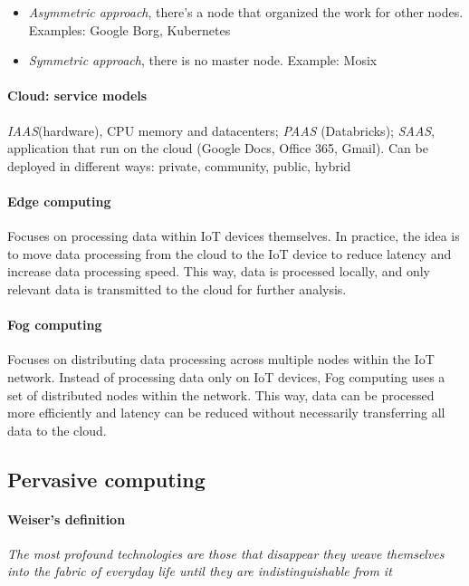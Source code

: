  \begin{itemize}
     \item \textit{Asymmetric approach}, there’s a node that organized the work for other nodes. Examples: Google Borg, Kubernetes
     \item \textit{Symmetric approach}, there is no master node. Example: Mosix
 \end{itemize}

 
\paragraph{Cloud: service models}
\textit{IAAS}(hardware), CPU memory and datacenters; \textit{PAAS} (Databricks); \textit{SAAS}, application that run on the cloud (Google Docs, Office 365, Gmail). Can be deployed in different ways: private, community, public, hybrid

\paragraph{Edge computing}
Focuses on processing data within IoT devices themselves. In practice, the idea is to move data processing from the cloud to the IoT device to reduce latency and increase data processing speed. This way, data is processed locally, and only relevant data is transmitted to the cloud for further analysis.

\paragraph{Fog computing}
Focuses on distributing data processing across multiple nodes within the IoT network. Instead of processing data only on IoT devices, Fog computing uses a set of distributed nodes within the network. This way, data can be processed more efficiently and latency can be reduced without necessarily transferring all data to the cloud.


\subsection{Pervasive computing}

\paragraph{Weiser's definition}
\textit{The most profound technologies are those that disappear they weave themselves
into the fabric of everyday life until they are indistinguishable from it}

